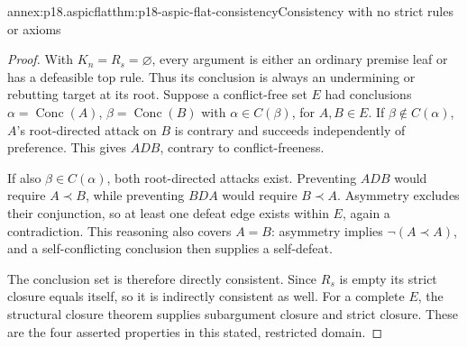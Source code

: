 \begin{annexitem}{annex:p18.aspicflat}{thm:p18-aspic-flat-consistency}{Consistency with no strict rules or axioms}
\begin{proof}
With \(K_n=R_s=\varnothing\), every argument is either an ordinary
premise leaf or has a defeasible top rule. Thus its conclusion is always
an undermining or rebutting target at its root.
Suppose a conflict-free set \(E\) had conclusions
\(\alpha=\operatorname{Conc}(A)\), \(\beta=\operatorname{Conc}(B)\)
with \(\alpha\in C(\beta)\), for \(A,B\in E\).
If \(\beta\notin C(\alpha)\), \(A\)'s root-directed attack on \(B\)
is contrary and succeeds independently of preference.
This gives \(A D B\), contrary to conflict-freeness.

If also \(\beta\in C(\alpha)\), both root-directed attacks exist.
Preventing \(A D B\) would require \(A\prec B\), while preventing
\(B D A\) would require \(B\prec A\). Asymmetry excludes their conjunction,
so at least one defeat edge exists within \(E\), again a contradiction.
This reasoning also covers \(A=B\): asymmetry implies \(\neg(A\prec A)\),
and a self-conflicting conclusion then supplies a self-defeat.

The conclusion set is therefore directly consistent. Since \(R_s\) is
empty its strict closure equals itself, so it is indirectly consistent
as well. For a complete \(E\), the structural closure theorem supplies
subargument closure and strict closure. These are the four asserted
properties in this stated, restricted domain.
\end{proof}
\end{annexitem}

